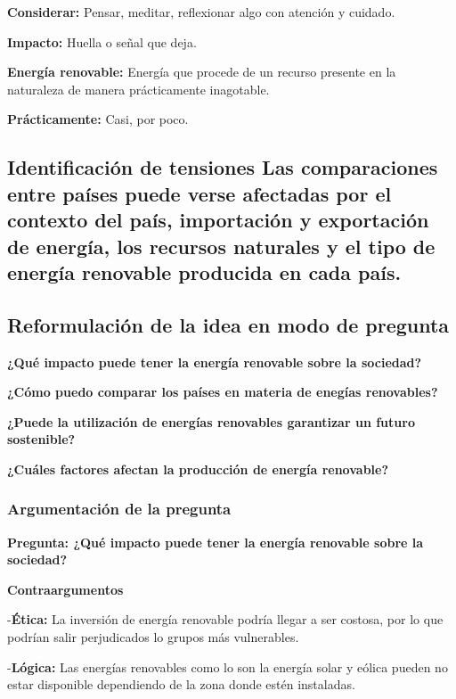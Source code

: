 \documentclass[
  letterpaper,
  DIV=11,
  numbers=noendperiod]{scrreprt}
\begin{document}
\textbf{Considerar:} Pensar, meditar, reflexionar algo con atención y
cuidado.

\textbf{Impacto:} Huella o señal que deja.

\textbf{Energía renovable:} Energía que procede de un recurso presente
en la naturaleza de manera prácticamente inagotable.

\textbf{Prácticamente:} Casi, por poco.

\subsection{Identificación de tensiones Las comparaciones entre países
puede verse afectadas por el contexto del país, importación y
exportación de energía, los recursos naturales y el tipo de energía
renovable producida en cada
país.}\label{identificaciuxf3n-de-tensiones-las-comparaciones-entre-pauxedses-puede-verse-afectadas-por-el-contexto-del-pauxeds-importaciuxf3n-y-exportaciuxf3n-de-energuxeda-los-recursos-naturales-y-el-tipo-de-energuxeda-renovable-producida-en-cada-pauxeds.}

\subsection{Reformulación de la idea en modo de
pregunta}\label{reformulaciuxf3n-de-la-idea-en-modo-de-pregunta}

\textbf{¿Qué impacto puede tener la energía renovable sobre la
sociedad?}

\textbf{¿Cómo puedo comparar los países en materia de enegías
renovables?}

\textbf{¿Puede la utilización de energías renovables garantizar un
futuro sostenible?}

\textbf{¿Cuáles factores afectan la producción de energía renovable?}

\subsubsection{Argumentación de la
pregunta}\label{argumentaciuxf3n-de-la-pregunta}

\textbf{Pregunta: ¿Qué impacto puede tener la energía renovable sobre la
sociedad?}

\textbf{Contraargumentos}

-\textbf{Ética:} La inversión de energía renovable podría llegar a ser
costosa, por lo que podrían salir perjudicados lo grupos más
vulnerables.

-\textbf{Lógica:} Las energías renovables como lo son la energía solar y
eólica pueden no estar disponible dependiendo de la zona donde estén
instaladas.
\end{document}
